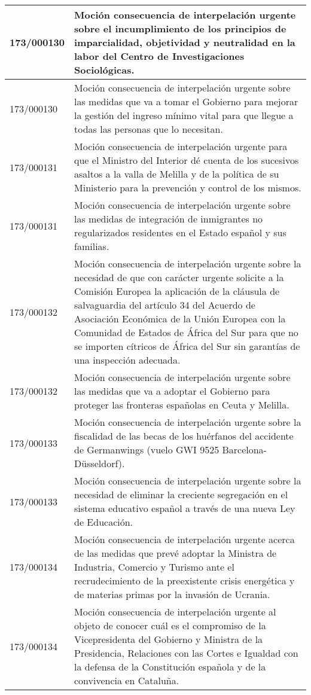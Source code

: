 {\begin{table}[H]
\begin{center}
\begin{tabularx}{\linewidth}{| l | X |}
\hline
173/000130 & Moción consecuencia de interpelación urgente sobre el incumplimiento de los principios de imparcialidad, objetividad y neutralidad en la labor del Centro de Investigaciones Sociológicas. \\
\hline
173/000130 & Moción consecuencia de interpelación urgente sobre las medidas que va a tomar el Gobierno para mejorar la gestión del ingreso mínimo vital para que llegue a todas las personas que lo necesitan. \\
\hline
173/000131 & Moción consecuencia de interpelación urgente para que el Ministro del Interior dé cuenta de los sucesivos asaltos a la valla de Melilla y de la política de su Ministerio para la prevención y control de los mismos. \\
\hline
173/000131 & Moción consecuencia de interpelación urgente sobre las medidas de integración de inmigrantes no regularizados residentes en el Estado español y sus familias. \\
\hline
173/000132 & Moción consecuencia de interpelación urgente sobre la necesidad de que con carácter urgente solicite a la Comisión Europea la aplicación de la cláusula de salvaguardia del artículo 34 del Acuerdo de Asociación Económica de la Unión Europea con la Comunidad de Estados de África del Sur para que no se importen cítricos de África del Sur sin garantías de una inspección adecuada. \\
\hline
173/000132 & Moción consecuencia de interpelación urgente sobre las medidas que va a adoptar el Gobierno para proteger las fronteras españolas en Ceuta y Melilla. \\
\hline
173/000133 & Moción consecuencia de interpelación urgente sobre la fiscalidad de las becas de los huérfanos del accidente de Germanwings (vuelo GWI 9525 Barcelona-Düsseldorf). \\
\hline
173/000133 & Moción consecuencia de interpelación urgente sobre la necesidad de eliminar la creciente segregación en el sistema educativo español a través de una nueva Ley de Educación. \\
\hline
173/000134 & Moción consecuencia de interpelación urgente acerca de las medidas que prevé adoptar la Ministra de Industria, Comercio y Turismo ante el recrudecimiento de la preexistente crisis energética y de materias primas por la invasión de Ucrania. \\
\hline
173/000134 & Moción consecuencia de interpelación urgente al objeto de conocer cuál es el compromiso de la Vicepresidenta del Gobierno y Ministra de la Presidencia, Relaciones con las Cortes e Igualdad con la defensa de la Constitución española y de la convivencia en Cataluña. \\

\end{tabularx}
\end{center}
\end{table}}
